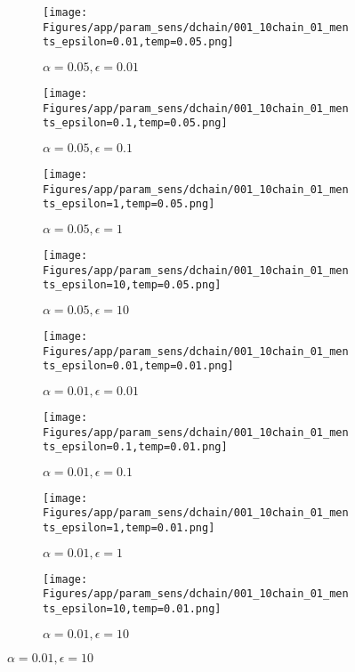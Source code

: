 \documentclass{article}
\theoremstyle{plain}
\begin{document}
\begin{appendices}
\begin{figure}
                \begin{subfigure}[b]{0.24\textwidth}
                    \centering
                    \texttt{[image: Figures/app/param\_sens/dchain/001\_10chain\_01\_ments\_epsilon=0.01,temp=0.05.png]}
                    \caption*{$\alpha=0.05,\epsilon=0.01$}
                \end{subfigure}
                \begin{subfigure}[b]{0.24\textwidth}
                    \centering
                    \texttt{[image: Figures/app/param\_sens/dchain/001\_10chain\_01\_ments\_epsilon=0.1,temp=0.05.png]}
                    \caption*{$\alpha=0.05,\epsilon=0.1$}
                \end{subfigure}
                \begin{subfigure}[b]{0.24\textwidth}
                    \centering
                    \texttt{[image: Figures/app/param\_sens/dchain/001\_10chain\_01\_ments\_epsilon=1,temp=0.05.png]}
                    \caption*{$\alpha=0.05,\epsilon=1$}
                \end{subfigure}
                \begin{subfigure}[b]{0.24\textwidth}
                    \centering
                    \texttt{[image: Figures/app/param\_sens/dchain/001\_10chain\_01\_ments\_epsilon=10,temp=0.05.png]}
                    \caption*{$\alpha=0.05,\epsilon=10$}
                \end{subfigure}
                
                \begin{subfigure}[b]{0.24\textwidth}
                    \centering
                    \texttt{[image: Figures/app/param\_sens/dchain/001\_10chain\_01\_ments\_epsilon=0.01,temp=0.01.png]}
                    \caption*{$\alpha=0.01,\epsilon=0.01$}
                \end{subfigure}
                \begin{subfigure}[b]{0.24\textwidth}
                    \centering
                    \texttt{[image: Figures/app/param\_sens/dchain/001\_10chain\_01\_ments\_epsilon=0.1,temp=0.01.png]}
                    \caption*{$\alpha=0.01,\epsilon=0.1$}
                \end{subfigure}
                \begin{subfigure}[b]{0.24\textwidth}
                    \centering
                    \texttt{[image: Figures/app/param\_sens/dchain/001\_10chain\_01\_ments\_epsilon=1,temp=0.01.png]}
                    \caption*{$\alpha=0.01,\epsilon=1$}
                \end{subfigure}
                \begin{subfigure}[b]{0.24\textwidth}
                    \centering
                    \texttt{[image: Figures/app/param\_sens/dchain/001\_10chain\_01\_ments\_epsilon=10,temp=0.01.png]}
                    \caption*{$\alpha=0.01,\epsilon=10$}
                \end{subfigure}
                

\end{figure}
\end{appendices}
\end{document}
